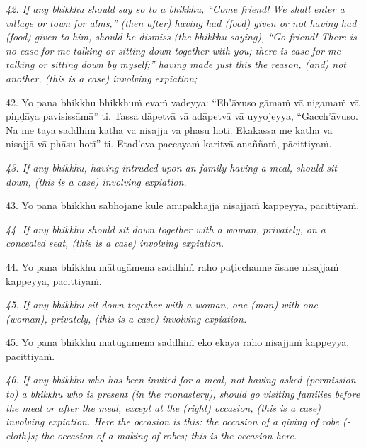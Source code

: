 \documentclass[11pt]{article}
\begin{document}
\begin{paracol}{2}
\begin{column}
{\itshape\footnotesize
42. If any bhikkhu should say so to a bhikkhu, “Come friend! We shall enter a village or town for alms,” (then after) having had (food) given or not having had (food) given to him, should he dismiss (the bhikkhu saying), “Go friend! There is no ease for me talking or sitting down together with you; there is ease for me talking or sitting down by myself;” having made just this the reason, (and) not another, (this is a case) involving expiation;
}
\switchcolumn

\begin{flushleft}
42. Yo pana bhikkhu bhikkhuṁ evaṁ vadeyya: “Eh’āvuso gāmaṁ vā nigamaṁ vā piṇḍāya pavisissāmā” ti. Tassa dāpetvā vā adāpetvā vā uyyojeyya, “Gacch’āvuso. Na me tayā saddhiṁ kathā vā nisajjā vā phāsu hoti. Ekakassa me kathā vā nisajjā vā phāsu hotī” ti. Etad’eva paccayaṁ karitvā anaññaṁ, pācittiyaṁ.
\switchcolumn*
\end{flushleft}

{\itshape\footnotesize
43. If any bhikkhu, having intruded upon an family having a meal, should sit down, (this is a case) involving expiation.
}
\switchcolumn

\begin{flushleft}
43. Yo pana bhikkhu sabhojane kule anūpakhajja nisajjaṁ kappeyya, pācittiyaṁ.
\switchcolumn*
\end{flushleft}

{\itshape\footnotesize
44 .If any bhikkhu should sit down together with a woman, privately, on a concealed seat, (this is a case) involving expiation.
}
\switchcolumn

\begin{flushleft}
44. Yo pana bhikkhu mātugāmena saddhiṁ raho paṭicchanne āsane nisajjaṁ kappeyya, pācittiyaṁ.
\switchcolumn*
\end{flushleft}

{\itshape\footnotesize
45. If any bhikkhu sit down together with a woman, one (man) with one (woman), privately, (this is a case) involving expiation.
}
\switchcolumn

\begin{flushleft}
45. Yo pana bhikkhu mātugāmena saddhiṁ eko ekāya raho nisajjaṁ kappeyya, pācittiyaṁ.
\switchcolumn*
\end{flushleft}

{\itshape\footnotesize
46. If any bhikkhu who has been invited for a meal, not having asked (permission to) a bhikkhu who is present (in the monastery), should go visiting families before the meal or after the meal, except at the (right) occasion, (this is a case) involving expiation. Here the occasion is this: the occasion of a giving of robe (-cloth)s; the occasion of a making of robes; this is the occasion here.
}
\switchcolumn


\end{column}
\end{paracol}
\end{document}
